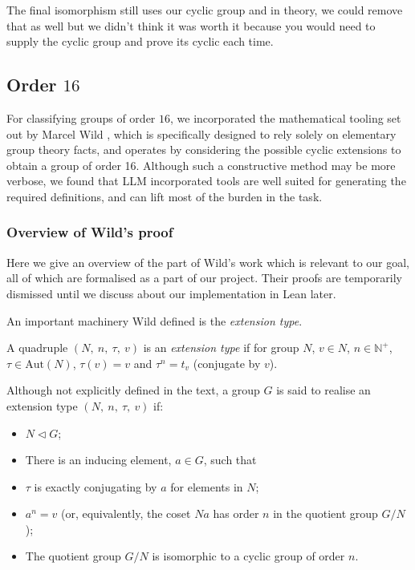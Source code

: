 The final isomorphism still uses our cyclic group and in theory, we could remove that as well but we didn't think it was worth it because you would need to supply the cyclic group and prove its cyclic each time.

\subsection{Order $16$}
\label{Order $16$}

For classifying groups of order $16$, we incorporated the mathematical tooling set out by Marcel Wild \cite{wild_groups_2005}, which is specifically designed to rely solely on elementary group theory facts, and operates by considering the possible cyclic extensions to obtain a group of order 16.
Although such a constructive method may be more verbose, we found that LLM incorporated tools are well suited for generating the required definitions, and can lift most of the burden in the task.

\subsubsection{Overview of Wild's proof}

Here we give an overview of the part of Wild's work which is relevant to our goal, all of which are formalised as a part of our project. Their proofs are temporarily dismissed until we discuss about our implementation in Lean later.

An important machinery Wild defined is the \textit{extension type}.

\begin{definition}[Wild]
    A quadruple $(N,\ n,\ \tau,\ v)$ is an \textit{extension type} if for group $N$, $v \in N$, $n \in \mathbb{N}^+$,  $\tau \in \text{Aut}(N)$, $\tau (v) = v$ and $\tau^n = t_v$ (conjugate by $v$).
\end{definition}

\begin{definition}
    Although not explicitly defined in the text, a group $G$ is said to realise an extension type $(N,\ n,\ \tau,\ v)$ if:
    \begin{itemize}
        \item $N \lhd G$;
        \item There is an inducing element, $a \in G$, such that
        \item $\tau$ is exactly conjugating by $a$ for elements in $N$;
        \item $a^n = v$ (or, equivalently, the coset $Na$ has order $n$ in the quotient group $G/N$);
        \item The quotient group $G/N$ is isomorphic to a cyclic group of order $n$.
    \end{itemize}
\end{definition}

